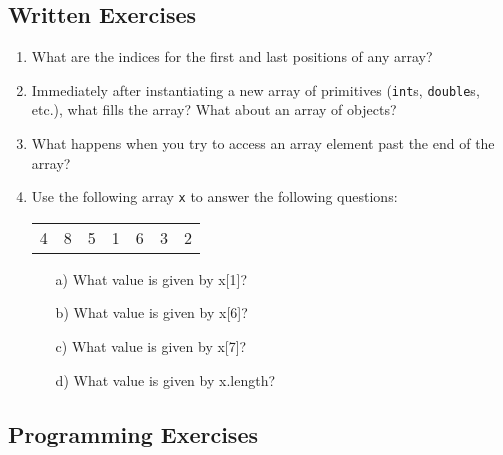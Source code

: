\subsection{Written Exercises}

\setcounter{counter}{1}
\begin{enumerate}[label={\arabic{counter}\addtocounter{counter}{1}}.]

\item What are the indices for the first and last positions of any array?

\item Immediately after instantiating a new array of primitives (\verb|int|s, \verb|double|s, etc.), what fills the array? What about an array of objects?

\item What happens when you try to access an array element past the end of the array?

\item Use the following array \verb|x| to answer the following questions:
\begin{table}[h]
\begin{tabular}{lllllll}
4 & 8 & 5 & 1 & 6 & 3 & 2
\end{tabular}
\end{table}
\begin{enumerate}
\item[a)]What value is given by x[1]?
\item[b)]What value is given by x[6]?
\item[c)]What value is given by x[7]?
\item[d)]What value is given by x.length?
\end{enumerate}

\end{enumerate}

\subsection{Programming Exercises}

